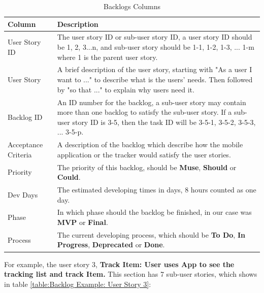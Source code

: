\documentclass[12pt,a4paper]{article}
\begin{document}
          \begin{table}[H]
            \centering
              \begin{tabularx}{\textwidth}{l X}
                \hline
                Column & Description  \\ \hline
                User Story ID & The user story ID or sub-user story ID, a user story ID should be 1, 2, 3...n, and sub-user story should be 1-1, 1-2, 1-3, ... 1-m  where 1 is the parent user story.\\ 
                User Story & A brief description of the user story, starting with "As a user I want to ..." to describe what is the users' needs. Then followed by "so that ..." to explain why users need it. \\ 
                Backlog ID & An ID number for the backlog, a sub-user story may contain more than one backlog to satisfy the sub-user story. If a sub-user story ID is  3-5, then the task ID will be 3-5-1, 3-5-2, 3-5-3, ... 3-5-p.  \\ 
                Acceptance Criteria & A description of the backlog which describe how the mobile application or the tracker would satisfy the user stories. \\ 
                Priority & The priority of this backlog, should be {\bf Muse}, {\bf Should} or {\bf Could}. \\                  
                Dev Days & The estimated developing times in days, 8 hours counted as one day. \\                  
                Phase & In which phase should the backlog be finished, in our case was {\bf MVP} or {\bf Final}. \\                  
                Process & The current developing process, which should be {\bf To Do}, {\bf In Progress}, {\bf Deprecated} or {\bf Done}.  \\                  
                \hline
              \end{tabularx}
              \caption[Table caption text]{Backlogs Columns}
              \label{table:Backlogs Column}
          \end{table}
          
          For example, the user story 3, {\bf Track Item: User uses App to see the tracking list and track Item.} This section has 7 sub-user stories, which shows in table \ref{table:Backlog Example: User Story 3}: 
          
\end{document}
